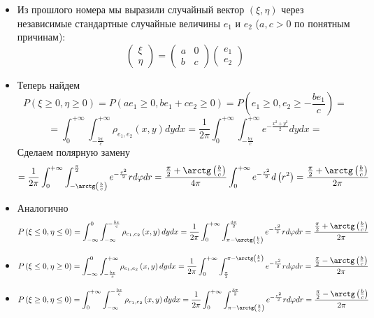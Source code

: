\begin{itemize}
\item Из прошлого номера мы выразили случайный вектор $\left(\xi, \eta\right)$ через независимые стандартные случайные величины $e_1$ и $e_2$ ($a, c > 0$ по понятным причинам):
\[
    \begin{pmatrix}
    \xi \\ \eta
    \end{pmatrix} = 
    \begin{pmatrix}
    a & 0 \\ b & c
    \end{pmatrix} 
    \begin{pmatrix}
    e_1 \\ e_2
    \end{pmatrix}
\]
\item Теперь найдем
\[
    P\left(\xi \geq 0, \eta \geq 0\right) = P\left(ae_1 \geq 0, b e_1 + c e_2 \geq 0\right) = P\left(e_1 \geq 0, e_2 \geq -\frac{be_1}{c}\right) = 
\]
\[
    = \int_{0}^{+\infty} \int_{-\frac{bx}{c}}^{+\infty} \rho_{e_1, e_2}\left(x, y\right) dy dx = 
    \frac 1 {2\pi} \int_{0}^{+\infty} \int_{-\frac{bx}{c}}^{+\infty} e ^ {-\frac{x ^ 2 + y ^ 2}{2}} dy dx = 
\]
Сделаем полярную замену
\[
    =  \frac 1 {2\pi} \int_{0}^{+\infty} \int_{- \arctg\left(\frac b c\right)}^{\frac \pi 2} e ^ {-\frac{r ^ 2}{2}} r d\varphi dr
    = \frac{\frac{\pi}{2} + \arctg\left(\frac b c\right)}{4\pi} \int_{0}^{+\infty} e ^ {-\frac{r ^ 2}{2}} d \left(r ^  2\right) = \frac{\frac{\pi}{2} + \arctg\left(\frac b c\right)}{2\pi}
\]
\item Аналогично
\[
    P\left(\xi \leq 0, \eta \leq 0\right) = 
    \int_{-\infty}^{0} \int_{-\infty}^{-\frac{bx}{c}} \rho_{e_1, e_2}\left(x, y\right) dy dx = \frac 1 {2\pi} \int_{0}^{+\infty} \int_{\pi - \arctg\left(\frac b c\right)}^{\frac {3\pi} 2} e ^ {-\frac{r ^ 2}{2}} r d\varphi dr = \frac{\frac{\pi}{2} + \arctg\left(\frac b c\right)}{2\pi}
\]
\item 
\[
    P\left(\xi \leq 0, \eta \geq 0\right) = 
    \int_{-\infty}^{0} \int^{+\infty}_{-\frac{bx}{c}} \rho_{e_1, e_2}\left(x, y\right) dy dx = 
    \frac 1 {2\pi} \int_{0}^{+\infty} \int^{\pi - \arctg\left(\frac b c\right)}_{\frac {\pi} 2} e ^ {-\frac{r ^ 2}{2}} r d\varphi dr = \frac{\frac \pi 2 - \arctg\left(\frac b c\right)}{2\pi}

\]
\item 
\[
    P\left(\xi \geq 0, \eta \leq 0\right) = 
    \int^{+\infty}_{0} \int_{-\infty}^{-\frac{bx}{c}} \rho_{e_1, e_2}\left(x, y\right) dy dx = 
    \frac 1 {2\pi} \int_{0}^{+\infty} \int_{\pi - \arctg\left(\frac b c\right)}^{\frac {3\pi} 2} e ^ {-\frac{r ^ 2}{2}} r d\varphi dr = \frac{\frac \pi 2 - \arctg\left(\frac b c\right)}{2\pi}

\]
 
\end{itemize}


